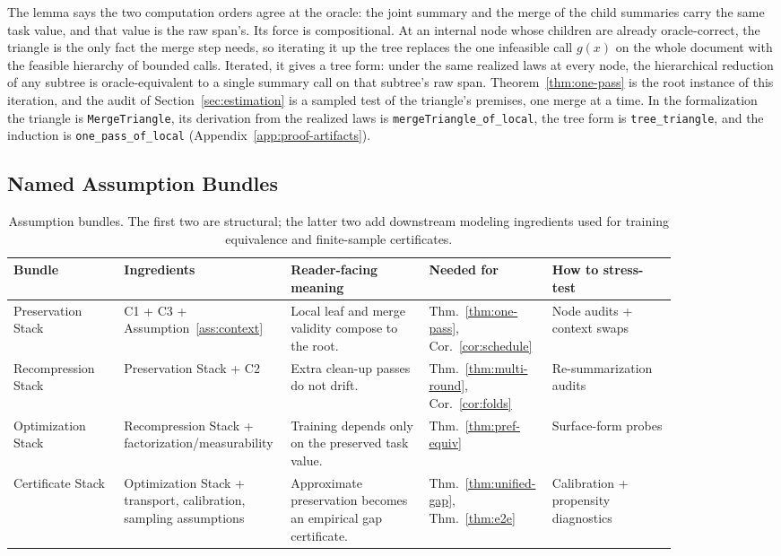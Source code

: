 The lemma says the two computation orders agree at the oracle: the joint summary and the merge of the child summaries carry the same task value, and that value is the raw span's. Its force is compositional. At an internal node whose children are already oracle-correct, the triangle is the only fact the merge step needs, so iterating it up the tree replaces the one infeasible call $g(x)$ on the whole document with the feasible hierarchy of bounded calls. Iterated, it gives a tree form: under the same realized laws at every node, the hierarchical reduction of any subtree is oracle-equivalent to a single summary call on that subtree's raw span. Theorem~\ref{thm:one-pass} is the root instance of this iteration, and the audit of Section~\ref{sec:estimation} is a sampled test of the triangle's premises, one merge at a time. In the formalization the triangle is \texttt{MergeTriangle}, its derivation from the realized laws is \texttt{mergeTriangle\_of\_local}, the tree form is \texttt{tree\_triangle}, and the induction is \texttt{one\_pass\_of\_local} (Appendix~\ref{app:proof-artifacts}).

\subsection{Named Assumption Bundles}

\begin{table}[htbp]
\centering\footnotesize
\setlength{\tabcolsep}{3pt}
\begin{tabular}{p{0.16\linewidth}p{0.18\linewidth}p{0.20\linewidth}p{0.14\linewidth}p{0.18\linewidth}}
\toprule
Bundle & Ingredients & Reader-facing meaning & Needed for & How to stress-test \\
\midrule
Preservation Stack & C1 + C3 + Assumption~\ref{ass:context} & Local leaf and merge validity compose to the root. & Thm.~\ref{thm:one-pass}, Cor.~\ref{cor:schedule} & Node audits + context swaps \\
Recompression Stack & Preservation Stack + C2 & Extra clean-up passes do not drift. & Thm.~\ref{thm:multi-round}, Cor.~\ref{cor:folds} & Re-summarization audits \\
Optimization Stack & Recompression Stack + factorization/measurability & Training depends only on the preserved task value. & Thm.~\ref{thm:pref-equiv} & Surface-form probes \\
Certificate Stack & Optimization Stack + transport, calibration, sampling assumptions & Approximate preservation becomes an empirical gap certificate. & Thm.~\ref{thm:unified-gap}, Thm.~\ref{thm:e2e} & Calibration + propensity diagnostics \\
\bottomrule
\end{tabular}
\caption{Assumption bundles. The first two are structural; the latter two add downstream modeling ingredients used for training equivalence and finite-sample certificates.}
\label{tab:assumption-bundles}
\end{table}

